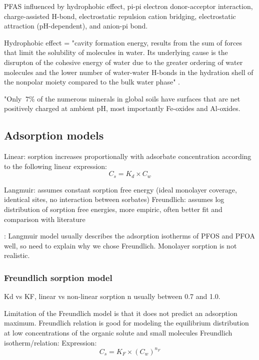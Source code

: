 PFAS influenced by hydrophobic effect, pi-pi electron donor-acceptor interaction, charge-assisted H-bond, electrostatic repulsion
cation bridging, electrostatic attraction (pH-dependent), and anion-pi bond.

Hydrophobic effect = "cavity formation energy, results from the sum of forces that limit the solubility of molecules in water. Its underlying cause is the disrupton of the cohesive energy of water due to the greater ordering of water molecules and the lower number of water-water H-bonds in the hydration shell of the nonpolar moiety compared to the bulk water phase" \citep{sigmund2022sorption}.

"Only $~7\%$ of the numerous minerals in global soils have surfaces that are net positively charged at ambient pH, most importantly Fe-oxides and Al-oxides. 

\subsection{Adsorption models}
Linear: sorption increases proportionally with adsorbate concentration according to the following linear expression:
\begin{equation}\label{linear}
C_s = K_d \times C_w
\end{equation}

Langmuir: assumes constant sorption free energy (ideal monolayer coverage, identical sites, no interaction between sorbates)
Freundlich: assumes log distribution of sorption free energies, more empiric, often better fit and comparison with literature

\citep{du2014adsorption}: Langmuir model usually describes the adsorption isotherms of PFOS and PFOA well, so need to explain why we chose Freundlich. Monolayer sorption is not realistic. 

\subsubsection{Freundlich sorption model}
Kd vs KF, linear vs non-linear sorption
n usually between 0.7 and 1.0. 

Limitation of the Freundlich model is that it does not predict an adsorption maximum. 
Freundlich relation is good for modeling the equilibrium distribution at low concentrations of the organic solute and small molecules \citep{vanloon2017Ch14}
Freundlich isotherm/relation: 
Expression:
\begin{equation} \label{eq:Freundlich}
    C_s = K_F \times (C_{w})^{n_F}
\end{equation}

